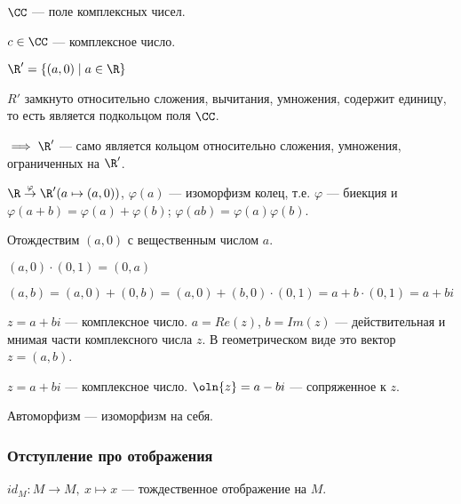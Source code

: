\begin{defn}
    $\CC$ --- поле комплексных чисел.
\end{defn}

\begin{defn}
    $c \in \CC$ --- комплексное число.
\end{defn}

\begin{theorem-non}
    
    $\R' = \{(a, 0) \mid a \in \R\}$
    
    $R'$ замкнуто относительно сложения, вычитания, умножения, содержит единицу, то есть является подкольцом поля $\CC$.
    
    $\implies \R'$ --- само является кольцом относительно сложения, умножения, ограниченных на $\R'$. 
    
    $\R \overset{\varphi}{\to} \R'(a \mapsto (a, 0))$, $\varphi(a)$ --- изоморфизм колец, т.е. $\varphi$ --- биекция и $\varphi(a + b) = \varphi(a) + \varphi(b)$; $\varphi(ab) = \varphi(a)\varphi(b)$.
    
    Отождествим $(a, 0)$ с вещественным числом $a$.
    
    $(a, 0) \cdot (0, 1) = (0, a)$
    
    $(a, b) = (a, 0) + (0, b) = (a, 0) + (b, 0) \cdot (0, 1) = a + b \cdot (0, 1) = a + bi$
\end{theorem-non}

\begin{defn}
    $z = a + bi$ --- комплексное число.
    $a = Re(z)$, $b = Im(z)$ --- действительная и мнимая части комплексного числа $z$.
    В геометрическом виде это вектор $z = (a, b)$.
\end{defn}

\begin{defn}
    $z = a + bi$ --- комплексное число. 
    $\oln{z} = a - bi$ --- сопряженное к $z$.
\end{defn}

\begin{defn}
    Автоморфизм --- изоморфизм на себя.
\end{defn}

\subsubsection*{Отступление про отображения}

\begin{defn}
    $id_M: M \to M,~x \mapsto x$ --- тождественное отображение на $M$.
\end{defn}

